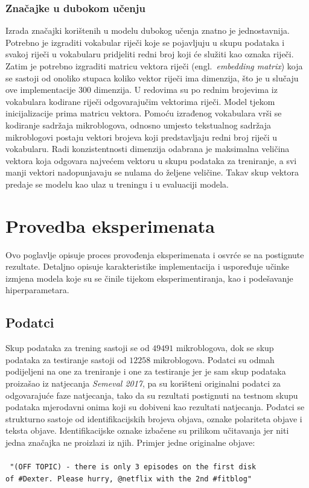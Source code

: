 \documentclass[times, utf8, zavrsni]{fer}
\begin{document}
\subsection{Značajke u dubokom učenju}

Izrada značajki korištenih u modelu dubokog učenja znatno je jednostavnija. Potrebno je izgraditi vokabular riječi koje se pojavljuju u skupu podataka i svakoj riječi u vokabularu pridjeliti redni broj koji će služiti kao oznaka riječi. Zatim je potrebno izgraditi matricu vektora riječi (engl.~\emph{embedding matrix}) koja se sastoji od onoliko stupaca koliko vektor riječi ima dimenzija, što je u slučaju ove implementacije 300 dimenzija. U redovima su po rednim brojevima iz vokabulara kodirane riječi odgovarajučim vektorima riječi. Model tjekom inicijalizacije prima matricu vektora. Pomoću izrađenog vokabulara vrši se kodiranje sadržaja mikroblogova, odnosno umjesto tekstualnog sadržaja mikroblogovi postaju vektori brojeva koji predstavljaju redni broj riječi u vokabularu. Radi konzistentnosti dimenzija odabrana je maksimalna veličina vektora koja odgovara najvećem vektoru u skupu podataka za treniranje, a svi manji vektori nadopunjavaju se nulama do željene veličine. Takav skup vektora predaje se modelu kao ulaz u treningu i u evaluaciji modela.

\chapter{Provedba eksperimenata}

Ovo poglavlje opisuje proces provođenja eksperimenata i osvrće se na postignute rezultate. Detaljno opisuje karakteristike implementacija i uspoređuje učinke izmjena modela koje su se činile tijekom eksperimentiranja, kao i podešavanje hiperparametara.

\section{Podatci}

Skup podataka za trening sastoji se od $49491$ mikroblogova, dok se skup podataka za testiranje sastoji od $12258$ mikroblogova. Podatci su odmah podijeljeni na one za treniranje i one za testiranje jer je sam skup podataka proizašao iz natjecanja \emph{Semeval 2017}, pa su korišteni originalni podatci za odgovarajuće faze natjecanja, tako da su rezultati postignuti na testnom skupu podataka mjerodavni onima koji su dobiveni kao rezultati natjecanja. Podatci se strukturno sastoje od identifikacijskih brojeva objava, oznake polariteta objave i teksta objave. Identifikacijske oznake izbačene su prilikom učitavanja jer niti jedna značajka ne proizlazi iz njih. 
Primjer jedne originalne objave:\\\\
\texttt{
"(OFF TOPIC) - there is only 3 episodes on the first disk \\of \#Dexter. Please hurry, @netflix with the 2nd \#fitblog" 
}\\
\end{document}
